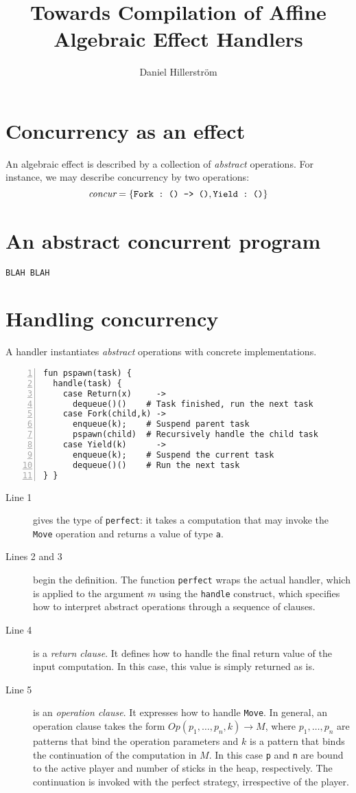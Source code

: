 \documentclass[noback,landscape]{infposter}
\title{Towards Compilation of Affine Algebraic Effect Handlers}
\author{Daniel Hillerström}
\begin{document}
\makeposter

\section{Concurrency as an effect}
An algebraic effect is described by a collection of \emph{abstract} operations. For instance, we may describe concurrency by two operations:
\[
  \emph{concur} = \{\texttt{\lstinline$Fork : () {}-> ()$}, \texttt{\lstinline$Yield : ()$}\}
\]

\section{An abstract concurrent program}
\begin{lstlisting}
BLAH BLAH
\end{lstlisting}

\section{Handling concurrency}
A handler instantiates \emph{abstract} operations with concrete implementations.
\begin{lstlisting}[numbers=left]
fun pspawn(task) {
  handle(task) {
    case Return(x)     -> 
      dequeue()()    # Task finished, run the next task
    case Fork(child,k) -> 
      enqueue(k);    # Suspend parent task
      pspawn(child)  # Recursively handle the child task
    case Yield(k)      -> 
      enqueue(k);    # Suspend the current task
      dequeue()()    # Run the next task
} }
\end{lstlisting}
\begin{description}
\item[Line 1] gives the type of \lstinline$perfect$: it takes a
  computation that may invoke the \lstinline$Move$ operation and
  returns a value of type \lstinline$a$.

\item[Lines 2 and 3] begin the definition. The function
  \lstinline$perfect$ wraps the actual handler, which is applied to
  the argument $m$ using the \lstinline$handle$ construct, which
  specifies how to interpret abstract operations through a sequence of
  clauses.

\item[Line 4] is a \emph{return clause}. It defines how to handle the
  final return value of the input computation. In this case, this
  value is simply returned as is.

\item[Line 5] is an \emph{operation clause}. It expresses how to
  handle \lstinline$Move$. In general, an operation clause takes the
  form $Op(p_1,\dots,p_n,k) \to M$, where $p_1,\dots,p_n$ are patterns
  that bind the operation parameters and $k$ is a pattern that binds
  the continuation of the computation in $M$. In this case
  \lstinline$p$ and \lstinline$n$ are bound to the active player and
  number of sticks in the heap, respectively. The continuation is
  invoked with the perfect strategy, irrespective of the player.
\end{description}
\vfill
\end{document}
